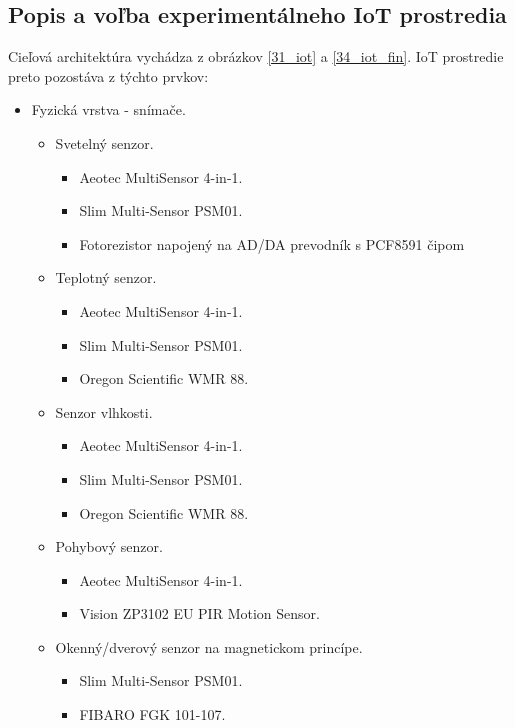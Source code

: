 \subsection{Popis a voľba experimentálneho IoT prostredia} \label{iotenv}
Cieľová architektúra vychádza z obrázkov \ref{31_iot} a \ref{34_iot_fin}. IoT prostredie preto pozostáva z týchto prvkov:
\begin{itemize}
\item Fyzická vrstva - snímače.
  \begin{itemize}
    \item Svetelný senzor.
      \begin{itemize}
        \item Aeotec MultiSensor 4-in-1.
        \item Slim Multi-Sensor PSM01. 
        \item Fotorezistor napojený na AD/DA prevodník s PCF8591 čipom
       \end{itemize}
    \item Teplotný senzor.
      \begin{itemize}
        \item Aeotec MultiSensor 4-in-1.
        \item Slim Multi-Sensor PSM01.        
        \item Oregon Scientific WMR 88. 
       \end{itemize}    
    \item Senzor vlhkosti.
      \begin{itemize}
        \item Aeotec MultiSensor 4-in-1.
        \item Slim Multi-Sensor PSM01.        
        \item Oregon Scientific WMR 88. 
       \end{itemize}     
    \item Pohybový senzor.
      \begin{itemize}
        \item Aeotec MultiSensor 4-in-1.
        \item Vision ZP3102 EU PIR Motion Sensor.        
       \end{itemize}     
    \item Okenný/dverový senzor na magnetickom princípe.
      \begin{itemize}
        \item Slim Multi-Sensor PSM01.
        \item FIBARO FGK 101-107.        
       \end{itemize}            

\end{itemize}
\end{itemize}
